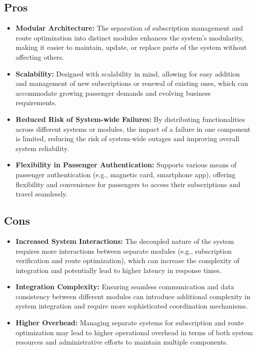 \subsection*{Pros}

\begin{itemize}[noitemsep]
    \item \textbf{Modular Architecture:} The separation of subscription management and route optimization into distinct modules enhances the system's modularity, making it easier to maintain, update, or replace parts of the system without affecting others.
    \item \textbf{Scalability:} Designed with scalability in mind, allowing for easy addition and management of new subscriptions or renewal of existing ones, which can accommodate growing passenger demands and evolving business requirements.
    \item \textbf{Reduced Risk of System-wide Failures:} By distributing functionalities across different systems or modules, the impact of a failure in one component is limited, reducing the risk of system-wide outages and improving overall system reliability.
    \item \textbf{Flexibility in Passenger Authentication:} Supports various means of passenger authentication (e.g., magnetic card, smartphone app), offering flexibility and convenience for passengers to access their subscriptions and travel seamlessly.
\end{itemize}

\subsection*{Cons}

\begin{itemize}[noitemsep]
    \item \textbf{Increased System Interactions:} The decoupled nature of the system requires more interactions between separate modules (e.g., subscription verification and route optimization), which can increase the complexity of integration and potentially lead to higher latency in response times.
    \item \textbf{Integration Complexity:} Ensuring seamless communication and data consistency between different modules can introduce additional complexity in system integration and require more sophisticated coordination mechanisms.
    \item \textbf{Higher Overhead:} Managing separate systems for subscription and route optimization may lead to higher operational overhead in terms of both system resources and administrative efforts to maintain multiple components.
\end{itemize}

